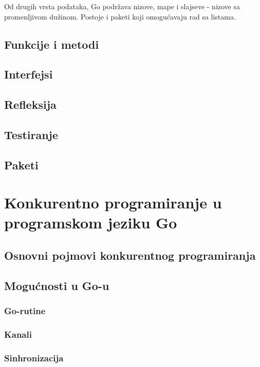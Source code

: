 \documentclass[12pt,oneside]{memoir}
\begin{document}
Od drugih vrsta podataka, Go podržava nizove, mape i slajseve - nizove sa promenljivom dužinom. Postoje i paketi koji omogućavaju rad sa listama.

\section{Funkcije i metodi}
 
\section{Interfejsi}

\section{Refleksija}

\section{Testiranje}

\section{Paketi}


\chapter{Konkurentno programiranje u programskom jeziku Go}

\section{Osnovni pojmovi konkurentnog programiranja}

\section{Mogućnosti u Go-u}

\subsection{Go-rutine}

\subsection{Kanali}

\subsection{Sinhronizacija}
\end{document}
